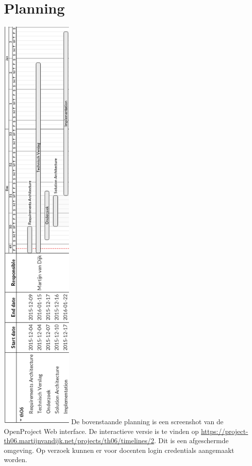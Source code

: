 \section{Planning}
\includegraphics[width=3.55cm]{planning.png}
\newpage
De bovenstaande planning is een screenshot van de OpenProject Web interface. De interactieve versie is te vinden op \url{https://project-th06.martijnvandijk.net/projects/th06/timelines/2}. Dit is een afgeschermde omgeving. Op verzoek kunnen er voor docenten login credentials aangemaakt worden.

